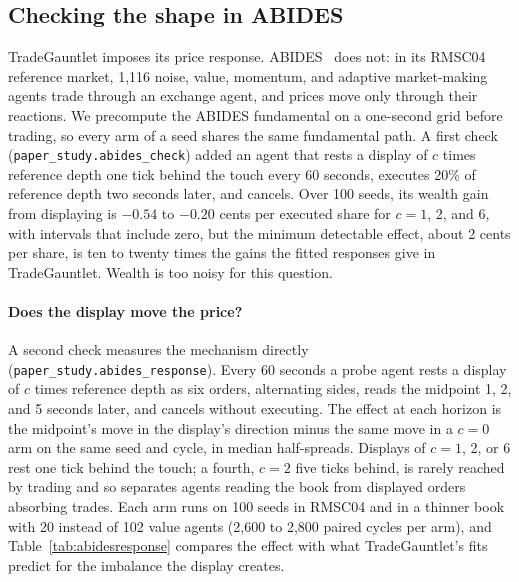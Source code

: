 \documentclass{article}
\begin{document}
\subsection{Checking the shape in ABIDES}\label{sec:abides}

TradeGauntlet imposes its price response. ABIDES~\cite{r4} does not: in its RMSC04 reference market, 1,116 noise, value, momentum, and adaptive market-making agents trade through an exchange agent, and prices move only through their reactions. We precompute the ABIDES fundamental on a one-second grid before trading, so every arm of a seed shares the same fundamental path. A first check (\texttt{paper\_study.abides\_check}) added an agent that rests a display of $c$ times reference depth one tick behind the touch every 60 seconds, executes 20\% of reference depth two seconds later, and cancels. Over 100 seeds, its wealth gain from displaying is $-0.54$ to $-0.20$ cents per executed share for $c = 1$, 2, and 6, with intervals that include zero, but the minimum detectable effect, about 2 cents per share, is ten to twenty times the gains the fitted responses give in TradeGauntlet. Wealth is too noisy for this question.

\paragraph{Does the display move the price?} A second check measures the mechanism directly (\texttt{paper\_study.abides\_response}). Every 60 seconds a probe agent rests a display of $c$ times reference depth as six orders, alternating sides, reads the midpoint 1, 2, and 5 seconds later, and cancels without executing. The effect at each horizon is the midpoint's move in the display's direction minus the same move in a $c = 0$ arm on the same seed and cycle, in median half-spreads. Displays of $c = 1$, 2, or 6 rest one tick behind the touch; a fourth, $c = 2$ five ticks behind, is rarely reached by trading and so separates agents reading the book from displayed orders absorbing trades. Each arm runs on 100 seeds in RMSC04 and in a thinner book with 20 instead of 102 value agents (2,600 to 2,800 paired cycles per arm), and Table~\ref{tab:abidesresponse} compares the effect with what TradeGauntlet's fits predict for the imbalance the display creates.
\end{document}
